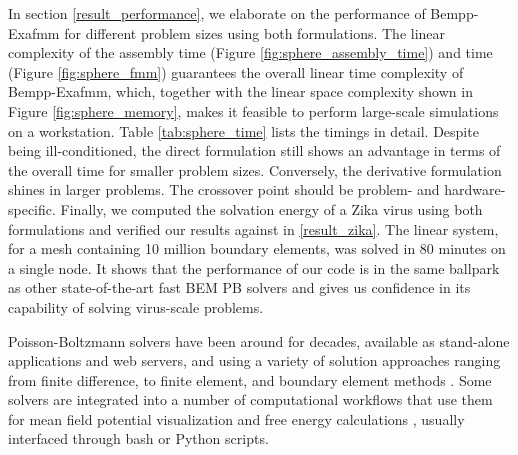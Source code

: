 In section \ref{result_performance}, we elaborate on the performance of Bempp-Exafmm for different problem sizes using both formulations.
The linear complexity of the assembly time (Figure \ref{fig:sphere_assembly_time}) and \fmm time (Figure \ref{fig:sphere_fmm}) guarantees the overall linear time complexity of Bempp-Exafmm, which, together with the linear space complexity shown in Figure \ref{fig:sphere_memory}, makes it feasible to perform large-scale simulations on a workstation.
Table \ref{tab:sphere_time} lists the timings in detail.
Despite being ill-conditioned, the direct formulation still shows an advantage in terms of the overall time for smaller problem sizes.
Conversely, the derivative formulation shines in larger problems.
The crossover point should be problem- and hardware-specific.
Finally, we computed the solvation energy of a Zika virus using both formulations and verified our results against \pygbe in \ref{result_zika}.
The linear system, for a mesh containing 10 million boundary elements, was solved in 80 minutes on a single node.
It shows that the performance of our code is in the same ballpark as other state-of-the-art fast BEM PB solvers \cite{GengKrasny2013,ZhangPengHuangPitsianisSunLu2015,CooperBardhanBarba2014} and gives us confidence in its capability of solving virus-scale problems.

Poisson-Boltzmann solvers have been around for decades, available as stand-alone applications and web servers, and using a variety of solution approaches ranging from finite difference, to finite element, and boundary element methods \cite{JurrusETal2018}.
Some solvers are integrated into a number of computational workflows that use them for mean field potential visualization \cite{HumphreyETal1996} and free energy calculations \cite{MillerETal2012,KumariETal2014,WangETal2018}, usually interfaced through bash or Python scripts.


